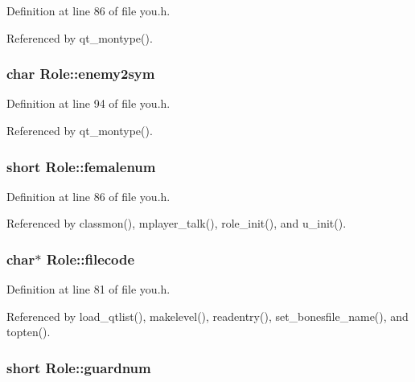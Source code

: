 Definition at line 86 of file you.\+h.



Referenced by qt\+\_\+montype().

\hypertarget{structRole_a9d080791fa1390a00f02d3cd16b63940}{
\subsubsection[{enemy2sym}]{\setlength{\rightskip}{0pt plus 5cm}char Role\+::enemy2sym}}\label{structRole_a9d080791fa1390a00f02d3cd16b63940}


Definition at line 94 of file you.\+h.



Referenced by qt\+\_\+montype().

\hypertarget{structRole_a3df6c34453ea826bb3bad15d174765d1}{
\subsubsection[{femalenum}]{\setlength{\rightskip}{0pt plus 5cm}short Role\+::femalenum}}\label{structRole_a3df6c34453ea826bb3bad15d174765d1}


Definition at line 86 of file you.\+h.



Referenced by classmon(), mplayer\+\_\+talk(), role\+\_\+init(), and u\+\_\+init().

\hypertarget{structRole_a34fefa6544afd2b36d6deeb9b6fa054f}{
\subsubsection[{filecode}]{ char$\ast$ Role\+::filecode}}\label{structRole_a34fefa6544afd2b36d6deeb9b6fa054f}


Definition at line 81 of file you.\+h.



Referenced by load\+\_\+qtlist(), makelevel(), readentry(), set\+\_\+bonesfile\+\_\+name(), and topten().

\hypertarget{structRole_a3bd52e2bb34943b6f68757fadf6fe6fb}{
\subsubsection[{guardnum}]{\setlength{\rightskip}{0pt plus 5cm}short Role\+::guardnum}}\label{structRole_a3bd52e2bb34943b6f68757fadf6fe6fb}


